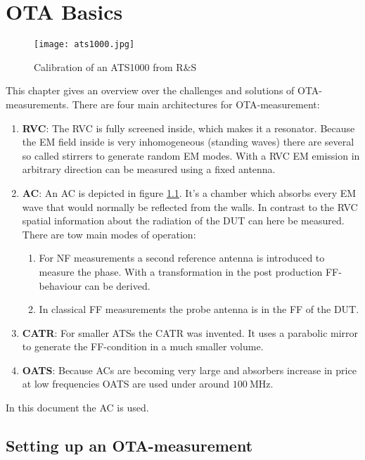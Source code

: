 \chapter{OTA Basics}


\begin{figure}[H]
\centering
\texttt{[image: ats1000.jpg]}
\caption{Calibration of an ATS1000 from R\&{}S}
\label{fig:ats}
\end{figure}

This chapter gives an overview over the challenges and solutions of \ac{OTA}-measurements. There are four main architectures for \ac{OTA}-measurement: \cite{ach}

\begin{enumerate}
\item \textbf{\acf{RVC}}: The \ac{RVC} is fully screened inside, which makes it a resonator. Because the \ac{EM} field inside is very inhomogeneous (standing waves) there are several so called stirrers to generate random \ac{EM} modes. With a \ac{RVC} \ac{EM} emission in arbitrary direction can be measured using a fixed antenna.
\item \textbf{\acf{AC}}: An \ac{AC} is depicted in figure \ref{fig:ats}. It's a chamber which absorbs every \ac{EM} wave that would normally be reflected from the walls. In contrast to the \ac{RVC} spatial information about the radiation of the \ac{DUT} can here be measured. There are tow main modes of operation:\begin{enumerate}
\item For \ac{NF} measurements a second reference antenna is introduced to measure the phase. With a transformation in the post production \ac{FF}-behaviour can be derived.
\item In classical \ac{FF} measurements the probe antenna is in the \ac{FF} of the \ac{DUT}.
\end{enumerate}
\item \textbf{\acf{CATR}}: For smaller \acp{ATS} the \ac{CATR} was invented. It uses a parabolic mirror to generate the \ac{FF}-condition in a much smaller volume.
\item \textbf{\acf{OATS}}: Because \acp{AC} are becoming very large and absorbers increase in price at low frequencies \ac{OATS} are used under around $\SI{100}{\mega\hertz}$.
\end{enumerate}

In this document the \ac{AC} is used.

\section{Setting up an OTA-measurement}

